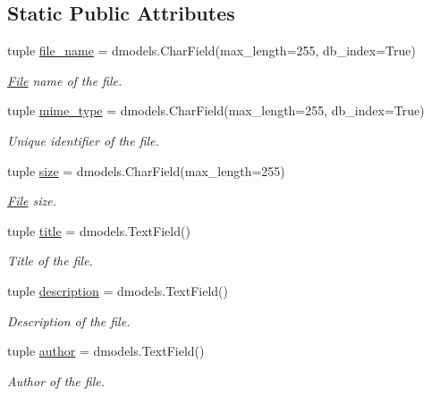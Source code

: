 \subsection*{Static Public Attributes}
\begin{DoxyCompactItemize}
\item 
tuple \hyperlink{classcore_1_1models_1_1File_a00e09db629f9ff8114662c4e950927bb}{file\-\_\-name} = dmodels.\-Char\-Field(max\-\_\-length=255, db\-\_\-index=True)
\begin{DoxyCompactList}\small\item\em \hyperlink{classcore_1_1models_1_1File}{File} name of the file. \end{DoxyCompactList}\item 
tuple \hyperlink{classcore_1_1models_1_1File_aedfac4d90aea7deacffb837534bb92bc}{mime\-\_\-type} = dmodels.\-Char\-Field(max\-\_\-length=255, db\-\_\-index=True)
\begin{DoxyCompactList}\small\item\em Unique identifier of the file. \end{DoxyCompactList}\item 
tuple \hyperlink{classcore_1_1models_1_1File_a18f6917981a73daa38b337f1e167c2d5}{size} = dmodels.\-Char\-Field(max\-\_\-length=255)
\begin{DoxyCompactList}\small\item\em \hyperlink{classcore_1_1models_1_1File}{File} size. \end{DoxyCompactList}\item 
tuple \hyperlink{classcore_1_1models_1_1File_a8b5744511785ff36e1312245bb92955e}{title} = dmodels.\-Text\-Field()
\begin{DoxyCompactList}\small\item\em Title of the file. \end{DoxyCompactList}\item 
tuple \hyperlink{classcore_1_1models_1_1File_a3ba747aa055c9952345d32fd0a2e93df}{description} = dmodels.\-Text\-Field()
\begin{DoxyCompactList}\small\item\em Description of the file. \end{DoxyCompactList}\item 
tuple \hyperlink{classcore_1_1models_1_1File_a4b56e6ce2f5bd75ad78f41cea297fd49}{author} = dmodels.\-Text\-Field()
\begin{DoxyCompactList}\small\item\em Author of the file. \end{DoxyCompactList}\item 

\end{DoxyCompactItemize}
